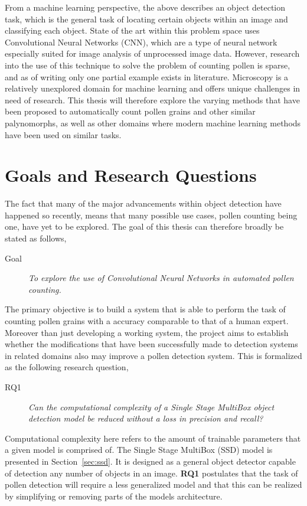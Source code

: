 From a machine learning perspective, the above describes an object detection task, which is the general task of locating certain objects within an image and classifying each object.
State of the art within this problem space uses Convolutional Neural Networks (CNN), which are a type of neural network especially suited for image analysis of unprocessed image data.
However, research into the use of this technique to solve the problem of counting pollen is sparse, and as of writing only one partial example exists in literature.
Microscopy is a relatively unexplored domain for machine learning and offers unique challenges in need of research.
This thesis will therefore explore the varying methods that have been proposed to automatically count pollen grains and other similar palynomorphs, as well as other domains where modern machine learning methods have been used on similar tasks.

\section{Goals and Research Questions}\label{sec:Goals and Research Questions}
The fact that many of the major advancements within object detection have happened so recently, means that many possible use cases, pollen counting being one, have yet to be explored.
The goal of this thesis can therefore broadly be stated as follows,

\begin{description}
\item[Goal] \textit{To explore the use of Convolutional Neural Networks in automated pollen counting.}
\end{description}

The primary objective is to build a system that is able to perform the task of counting pollen grains with a accuracy comparable to that of a human expert.
Moreover than just developing a working system, the project aims to establish whether the modifications that have been successfully made to detection systems in related domains also may improve a pollen detection system.
This is formalized as the following research question,

\begin{description}
\item[RQ1] \textit{Can the computational complexity of a Single Stage MultiBox object detection model be reduced without a loss in precision and recall?}
\end{description}

Computational complexity here refers to the amount of trainable parameters that a given model is comprised of.
The Single Stage MultiBox (SSD) model is presented in Section~\ref{sec:ssd}.
It is designed as a general object detector capable of detection any number of objects in an image.
\textbf{RQ1} postulates that the task of pollen detection will require a less generalized model and that this can be realized by simplifying or removing parts of the models architecture.

